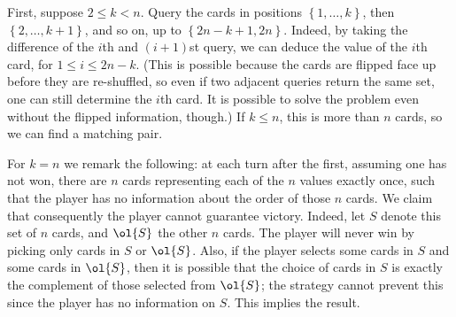 \documentclass[11pt]{scrartcl}
\begin{document}
First, suppose $2 \le k < n$. Query the cards in positions $\left\{ 1, \dots, k \right\}$,
then $\left\{ 2, \dots, k+1 \right\}$, and so on, up to $\left\{ 2n-k+1, 2n \right\}$.
Indeed, by taking the difference of the $i$th and $(i+1)$st query,
we can deduce the value of the $i$th card, for $1 \le i \le 2n-k$.
(This is possible because the cards are flipped face up before they are re-shuffled,
so even if two adjacent queries return the same set,
one can still determine the $i$th card.
It is possible to solve the problem even without the flipped information, though.)
If $k \le n$, this is more than $n$ cards, so we can find a matching pair.

For $k = n$ we remark the following:
at each turn after the first, assuming one has not won,
there are $n$ cards representing each of the $n$ values exactly once,
such that the player has no information about the order of those $n$ cards.
We claim that consequently the player cannot guarantee victory.
Indeed, let $S$ denote this set of $n$ cards, and $\ol{S}$ the other $n$ cards.
The player will never win by picking only cards in $S$ or $\ol{S}$.
Also, if the player selects some cards in $S$ and some cards in $\ol{S}$,
then it is possible that the choice of cards in $S$ is exactly the complement
of those selected from $\ol{S}$; the strategy cannot prevent this since
the player has no information on $S$. This implies the result.
\pagebreak
\end{document}
